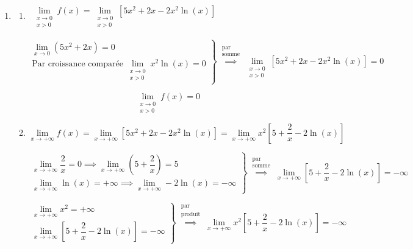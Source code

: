 \begin{enumerate}
	\item
	\begin{enumerate}
		\item $\begin{gathered}\lim\limits_{\substack{x \to 0\\x>0}}f(x) = \lim\limits_{\substack{x \to 0\\x>0}}\left[5x^2 + 2x - 2x^2\ln(x)\right]\end{gathered}$
		
		\[\left.
		\begin{array}{r}
			\lim\limits_{x \to 0}\left(5x^2+2x\right) = 0\\
			\text{Par croissance comparée}\: \lim\limits_{\substack{x \to 0\\x>0}}x^2\ln(x) = 0
		\end{array}\right\} \overset{\substack{\text{par} \\ \text{somme}}}{\implies} \lim_{\substack{x \to 0\\x>0}}\left[5x^2 + 2x - 2x^2 \ln (x)\right] = 0\]
		
		\[\boxed{\lim_{\substack{x \to 0\\x>0}}f(x) = 0}\]
		\item $\lim\limits_{x \to +\infty}f(x) = \lim\limits_{x \to +\infty}\left[5x^2+2x-2x^2\ln (x)\right] = \lim\limits_{x \to +\infty}x^2\left[5+\dfrac{2}{x}-2\ln(x)\right]$
		
		\[\renewcommand{\arraystretch}{2}
		\left.
		\begin{array}{r}
			\lim\limits_{x \to +\infty}\dfrac{2}{x} = 0 \implies \lim\limits_{x \to +\infty}\left(5+\dfrac{2}{x}\right) = 5 \\
			\lim\limits_{x \to +\infty}\ln(x) = +\infty \implies \lim\limits_{x \to +\infty}-2\ln(x) = -\infty
		\end{array}\right\} \overset{\substack{\text{par} \\ \text{somme}}}{\implies} \lim_{x \to +\infty}\left[5 + \dfrac{2}{x} - 2\ln (x)\right] = -\infty
		\]
		
		\[\renewcommand{\arraystretch}{2}
		\left.
		\begin{array}{r}
			\lim\limits_{x \to +\infty}x^2 = +\infty \\
			\lim\limits_{x \to +\infty}\left[5 + \dfrac{2}{x} - 2\ln (x)\right] = -\infty
		\end{array}\right\} \overset{\substack{\text{par} \\ \text{produit}}}{\implies} \lim_{x \to +\infty}x^2\left[5+\dfrac{2}{x}-2\ln(x)\right] = -\infty
		\]
		

\end{enumerate}
\end{enumerate}
